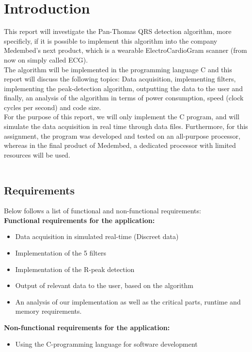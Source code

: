 \documentclass[12pt,a4paper]{article}
\begin{document}
\section{Introduction}
	This report will investigate the Pan-Thomas QRS detection algorithm, more specificly, if it is possible to implement this algorithm into the company Medembed's next product, which is a wearable ElectroCardioGram scanner (from now on simply called ECG).\\
	The algorithm will be implemented in the programming language C and this report will discuss the following topics: Data acquisition, implementing filters, implementing the peak-detection algorithm, outputting the data to the user and finally, an analysis of the algorithm in terms of power consumption, speed (clock cycles per second) and code size.\\
	For the purpose of this report, we will only implement the C program, and will simulate the data acquisition in real time through data files. Furthermore, for this assignment, the program was developed and tested on an all-purpose processor, whereas in the final product of Medembed, a dedicated processor with limited resources will be used.\\
\\
\subsection{Requirements}
Below follows a list of functional and non-functional requirements:\\

\textbf{ Functional requirements for the application:}
\begin{itemize}
	\item Data acquisition in simulated real-time (Discreet data)
	\item Implementation of the 5 filters
	\item Implementation of the R-peak detection
	\item Output of relevant data to the user, based on the algorithm
	\item An analysis of our implementation as well as the critical parts, runtime and memory requirements.
\end{itemize}
\textbf{Non-functional requirements for the application:}
\begin {itemize}
	\item Using the C-programming language for software development
\end{itemize}
\end{document}
